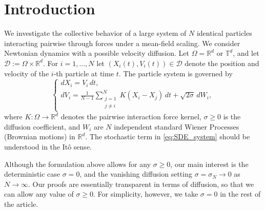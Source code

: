 \documentclass[pdflatex,sn-mathphys-num]{sn-jnl}
\theoremstyle{thmstyleone}%
\theoremstyle{thmstyletwo}%
\theoremstyle{thmstylethree}%
\begin{document}
\medskip

\tableofcontents

\section{Introduction}\label{sec1}

We investigate the collective behavior of a large system of \(N\) identical
particles interacting pairwise through forces under a mean-field scaling. We consider Newtonian dynamics with a possible velocity diffusion. Let \(\Omega = \mathbb{R}^d\) or \(\mathbb T^d\), and let $\mathcal{D} := \Omega \times \mathbb{R}^d$. For \(i=1,\dots,N\) let \((X_i(t),V_i(t))\in\mathcal D\) denote the position and velocity of the \(i\)-th particle at time \(t\). The particle system is governed by
\begin{equation}\label{eq:SDE_system}
\begin{cases}
dX_i = V_i\,dt, \\[2mm]
dV_i = \displaystyle \frac{1}{N-1}\sum_{\substack{j=1\\ j\neq i}}^N K(X_i-X_j)\,dt
+\sqrt{2\sigma}\,dW_i,
\end{cases}
\end{equation}
where \(K:\Omega\to\mathbb{R}^d\) denotes the pairwise interaction force kernel, \(\sigma\ge 0\) is the diffusion coefficient, and $W_i$ are $N$ independent standard Wiener Processes (Brownian motions) in $\mathbb{R}^d$. The stochastic term in \eqref{eq:SDE_system} should be understood in the Itô sense.


Although the formulation above allows for any \(\sigma\ge0\), our main interest is the deterministic case \(\sigma=0\), and the vanishing diffusion setting $\sigma=\sigma_N\to 0$ as $N\to \infty$. Our proofs are essentially transparent in terms of diffusion, so that we can allow any value of $\sigma\geq 0$. For simplicity, however, we take $\sigma=0$ in the rest of the article.
\end{document}
